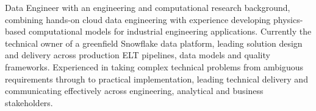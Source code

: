 

\begin{cvparagraph}

Data Engineer with an engineering and computational research background, combining hands-on cloud data engineering with experience developing physics-based computational models for industrial engineering applications. Currently the technical owner of a greenfield Snowflake data platform, leading solution design and delivery across production ELT pipelines, data models and quality frameworks. Experienced in taking complex technical problems from ambiguous requirements through to practical implementation, leading technical delivery and communicating effectively across engineering, analytical and business stakeholders.
\end{cvparagraph}
